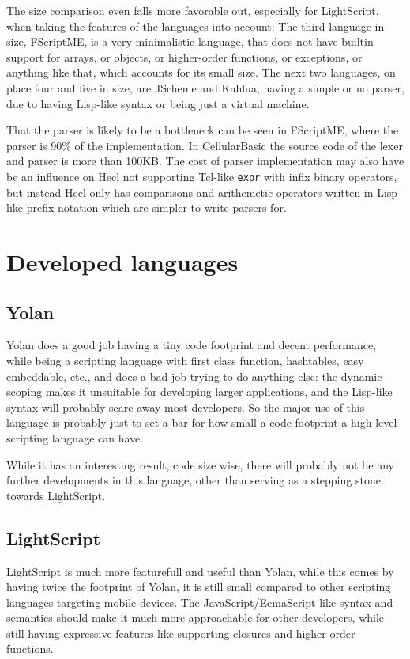 \documentclass[11pt]{report}
\begin{document}
The size comparison even falls more favorable out, especially for LightScript, when taking the features of the languages into account:
The third language in size, FScriptME, is a very minimalistic language, that does not have builtin support for arrays, or objects, or higher-order functions, or exceptions, or anything like that, which accounts for its small size.
The next two languages, on place four and five in size, are JScheme and Kahlua,
having a simple or no parser, due to having Lisp-like syntax or being just a virtual machine.

That the parser is likely to be a bottleneck can be seen in FScriptME, where the parser is 90\% of the implementation. In CellularBasic the source code of the lexer and parser is more than 100KB. 
The cost of parser implementation may also have be an influence on Hecl not supporting Tcl-like \verb|expr| with infix binary operators, but instead Hecl only has comparisons and arithemetic operators written in Lisp-like prefix notation which are simpler to write parsers for.

\section{Developed languages}
\subsection{Yolan}
Yolan does a good job having a tiny code footprint and decent performance, while being a scripting language with first class function, hashtables, easy embeddable, etc., and does a bad job trying to do anything else:
the dynamic scoping makes it unsuitable for developing larger applications, and the Lisp-like syntax will probably scare away most developers.
So the major use of this language is probably just to set a bar for how small a code footprint a high-level scripting language can have.

While it has an interesting result, code size wise, there will probably not be any further developments in this language, other than serving as a stepping stone towards LightScript.

\subsection{LightScript}
LightScript is much more featurefull and useful than Yolan, while this comes by having twice the footprint of Yolan, it is still small compared to other scripting languages targeting mobile devices. 
The JavaScript/EcmaScript-like syntax and semantics should make it much more approachable for other developers, while still having expressive features like supporting closures and higher-order functions.
\end{document}
